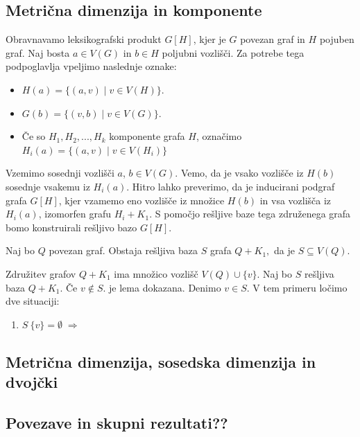 \documentclass[mat1, tisk]{fmfdelo}
\begin{document}
\subsection{Metrična dimenzija in komponente}
Obravnavamo leksikografski produkt $G[H]$, kjer je $G$ povezan graf in $H$ pojuben 
graf. Naj bosta $a \in V(G)$ in $b \in H$ poljubni vozlišči. Za potrebe tega 
podpoglavlja vpeljimo naslednje oznake:
\begin{itemize}
    \item $H(a) = \{ (a, v) \; | \; v \in V(H) \}$.
    \item $G(b) = \{ (v, b) \; | \; v \in V(G) \}$.
    \item Če so $H_1, H_2, ..., H_k$ komponente grafa $H$, označimo 
    $H_i(a) = \{ (a, v) \; | \; v \in V(H_i) \}$
\end{itemize}

Vzemimo sosednji vozlišči $a$, $b \in V(G)$. Vemo, da je vsako vozlišče iz $H(b)$ 
sosednje vsakemu iz $H_i(a).$ 
Hitro lahko preverimo, da je inducirani podgraf grafa $G[H]$, kjer vzamemo eno 
vozlišče iz množice $H(b)$ in vsa vozlišča iz $H_i(a)$, izomorfen grafu $H_i + K_1.$ 
S pomočjo rešljive baze tega združenega grafa bomo konstruirali rešljivo bazo $G[H]$.

\begin{lema}
    Naj bo $Q$ povezan graf. Obstaja rešljiva baza $S$ grafa $Q + K_1,$ da je 
    $S \subseteq V(Q).$
\end{lema}

\begin{dokaz}
    Združitev grafov $Q + K_1$ ima množico vozlišč $V(Q) \cup \{ v \}.$ Naj bo $S$ 
    rešljiva baza $Q + K_1$. Če $v \notin S.$ je lema dokazana. Denimo $v \in S.$ 
    V tem primeru ločimo dve situaciji:
    \begin{enumerate}
        \item $S\ \{ v \} = \emptyset \; \Rightarrow \;$   
    \end{enumerate}
\end{dokaz}





\subsection{Metrična dimenzija, sosedska dimenzija in dvojčki}




\subsection{Povezave in skupni rezultati??}



\end{document}
